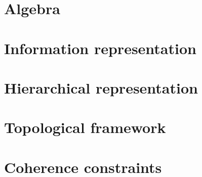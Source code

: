 

%

\newtoggle{thmsty}
\togglefalse{thmsty}









	\begin{frame}
		\titlepage
	\end{frame}
	
	\section{Algebra}
	

	\section{Information representation}
	
	
	\section{Hierarchical representation}
	
	
	\section{Topological framework}
	
	
	\section{Coherence constraints}
	
	
